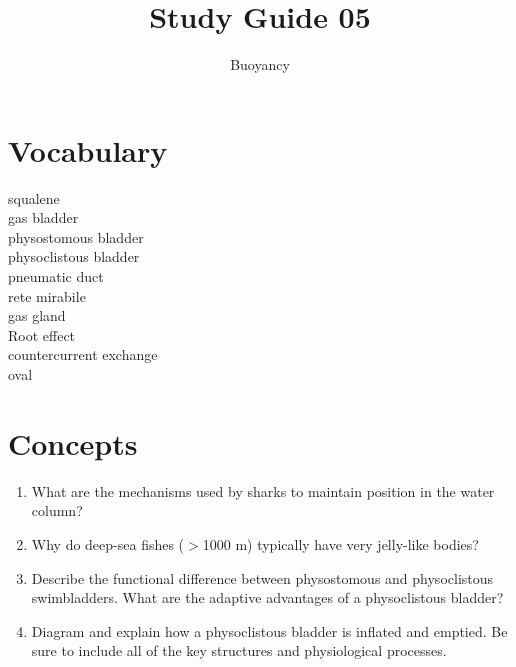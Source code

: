 \documentclass[nofonts, letterpaper]{tufte-handout}
\title{Study Guide 05}
\author{Buoyancy}
\date{} %
\begin{document}
\maketitle	%


\section{Vocabulary} 
\vspace{-1\baselineskip}
\begin{multicols}{2}
squalene \\
gas bladder \\
physostomous bladder \\
physoclistous bladder \\
pneumatic duct \\
rete mirabile \\
gas gland \\
Root effect \\
countercurrent exchange \\
oval \\
\end{multicols}

\section{Concepts}

\begin{enumerate}
	\item What are the mechanisms used by sharks to maintain position in the water column?

	\item Why do deep-sea fishes ($>$1000 m) typically have very jelly-like bodies?

	\item Describe the functional difference between physostomous and physoclistous swimbladders.  What are the adaptive advantages of a physoclistous bladder?

	\item Diagram and explain how a physoclistous bladder is inflated and emptied. Be sure to include all of the key structures and physiological processes.

\end{enumerate}
\end{document}

